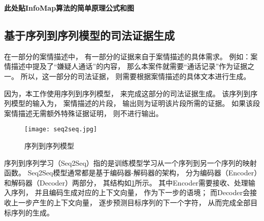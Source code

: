\textbf{\color{red} 此处贴InfoMap算法的简单原理公式和图}

\subsection{基于序列到序列模型的司法证据生成}
在一部分的案情描述中，
有一部分的证据来自于案情描述的具体需求。
例如：案情描述中提及了“嫌疑人通话”的内容，
那么本案件就需要“通话记录”作为证据之一。
所以，这一部分的司法证据，
则需要根据案情描述的具体文本进行生成。

因为，本工作使用序列到序列模型，
来完成这部分的司法证据生成。
该序列到序列模型的输入为，
案情描述的片段，
输出则为证明该片段所需的证据。
如果该段案情描述无需额外特殊证据证明，
则不进行输出。

\begin{figure}[h]
	\centering
	\texttt{[image: seq2seq.jpg]}
	\caption{序列到序列模型}
	\label{seq}
\end{figure}

序列到序列学习（Seq2Seq）指的是训练模型学习从一个序列到另一个序列的映射函数。
Seq2Seq模型通常都是基于编码器-解码器的架构，
分为编码器（Encoder）和解码器（Decoder）两部分，
其结构如\cref{seq}所示。
其中Encoder需要接收、处理输入序列，
并且编码生成对应的上下文向量，
作为下一步的语境；
而Decoder会接收上一步产生的上下文向量，
逐步预测目标序列的下一个字符，
从而完成全部目标序列的生成。